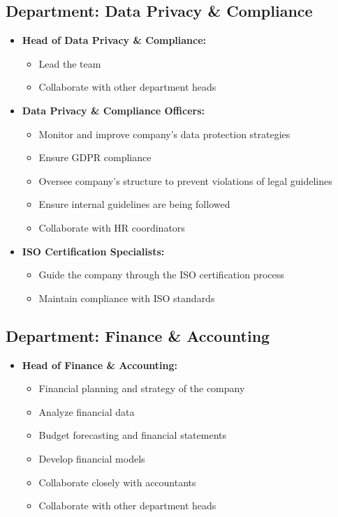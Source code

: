\subsection{Department: Data Privacy \& Compliance}
\begin{itemize}
    \item \textbf{Head of Data Privacy \& Compliance:}
            \begin{itemize}
                \item Lead the team
                \item Collaborate with other department heads
            \end{itemize}    
    \item \textbf{Data Privacy \& Compliance Officers:}
            \begin{itemize}
                \item Monitor and improve company’s data protection strategies
                \item Ensure GDPR compliance
                \item Oversee company’s structure to prevent violations of legal guidelines
                \item Ensure internal guidelines are being followed
                \item Collaborate with HR coordinators
            \end{itemize}
    \item \textbf{ISO Certification Specialists:}
            \begin{itemize}
                \item Guide the company through the ISO certification process
                \item Maintain compliance with ISO standards
            \end{itemize}
\end{itemize}

\subsection{Department: Finance \& Accounting}
\begin{itemize}
    \item \textbf{Head of Finance \& Accounting:}
            \begin{itemize}
                \item Financial planning and strategy of the company
                \item Analyze financial data
                \item Budget forecasting and financial statements
                \item Develop financial models
                \item Collaborate closely with accountants
                \item Collaborate with other department heads
            \end{itemize}
\end{itemize}

